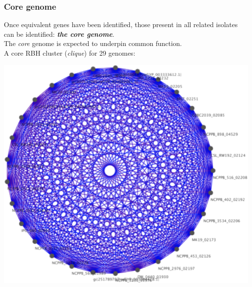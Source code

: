 
\begin{frame}
  \frametitle{Core genome}
  Once equivalent genes have been identified, those present in all related isolates can be identified: \textbf{\textit{the core genome}}.\\
  \textcolor{hutton_green}{The \textit{core} genome is expected to underpin common function.}\\
  A core RBH cluster (\textit{clique}) for 29 genomes:
  \begin{center}
      \includegraphics[height=0.55\textheight]{images/core_cluster} 
  \end{center}
\end{frame}

